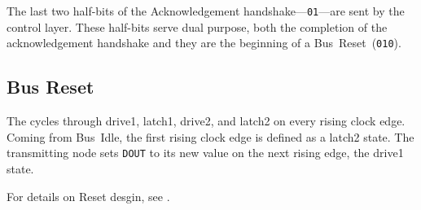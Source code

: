The last two half-bits of the Acknowledgement handshake---{\tt 01}---are sent
by the control layer. These half-bits serve dual purpose, both the completion
of the acknowledgement handshake and they are the beginning of a
Bus~Reset~({\tt 010}).


\subsection{Bus Reset}
\label{sec:protocol-reset}
The \bus cycles through {\sc drive1}, {\sc latch1}, {\sc drive2}, and {\sc
latch2} on every rising clock edge.  Coming from Bus~Idle, the first rising
clock edge is defined as a {\sc latch2 state}.
The transmitting node sets {\tt DOUT} to
its new value on the next rising edge, the {\sc drive1} state.

For details on Reset desgin, see .

